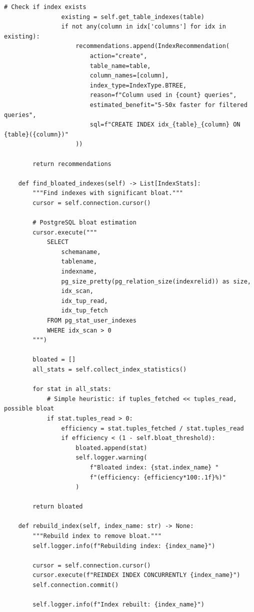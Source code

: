 \begin{lstlisting}[style=python, caption=IndexManager with Smart Recommendations]
                # Check if index exists
                existing = self.get_table_indexes(table)
                if not any(column in idx['columns'] for idx in existing):
                    recommendations.append(IndexRecommendation(
                        action="create",
                        table_name=table,
                        column_names=[column],
                        index_type=IndexType.BTREE,
                        reason=f"Column used in {count} queries",
                        estimated_benefit="5-50x faster for filtered queries",
                        sql=f"CREATE INDEX idx_{table}_{column} ON {table}({column})"
                    ))

        return recommendations

    def find_bloated_indexes(self) -> List[IndexStats]:
        """Find indexes with significant bloat."""
        cursor = self.connection.cursor()

        # PostgreSQL bloat estimation
        cursor.execute("""
            SELECT
                schemaname,
                tablename,
                indexname,
                pg_size_pretty(pg_relation_size(indexrelid)) as size,
                idx_scan,
                idx_tup_read,
                idx_tup_fetch
            FROM pg_stat_user_indexes
            WHERE idx_scan > 0
        """)

        bloated = []
        all_stats = self.collect_index_statistics()

        for stat in all_stats:
            # Simple heuristic: if tuples_fetched << tuples_read, possible bloat
            if stat.tuples_read > 0:
                efficiency = stat.tuples_fetched / stat.tuples_read
                if efficiency < (1 - self.bloat_threshold):
                    bloated.append(stat)
                    self.logger.warning(
                        f"Bloated index: {stat.index_name} "
                        f"(efficiency: {efficiency*100:.1f}%)"
                    )

        return bloated

    def rebuild_index(self, index_name: str) -> None:
        """Rebuild index to remove bloat."""
        self.logger.info(f"Rebuilding index: {index_name}")

        cursor = self.connection.cursor()
        cursor.execute(f"REINDEX INDEX CONCURRENTLY {index_name}")
        self.connection.commit()

        self.logger.info(f"Index rebuilt: {index_name}")


\end{lstlisting}
